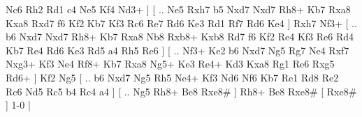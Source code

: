 Nc6  Rh2 Rd1  c4 Ne5  Kf4 Nd3+   ]  [ .. Ne5  Rxh7 b5  Nxd7 Nxd7  Rh8+ Kb7  Rxa8 Kxa8  Rxd7 f6  Kf2 Kb7  Kf3 Rc6  Re7 Rd6  Ke3 Rd1  Rf7 Rd6  Ke4   ]  Rxh7   Nf3+ [ .. b6  Nxd7 Nxd7  Rh8+ Kb7  Rxa8 Nb8  Rxb8+ Kxb8  Rd7 f6  Kf2 Re4  Kf3 Re6  Rd4 Kb7  Re4 Rd6  Ke3 Rd5  a4 Rh5  Re6   ]  [ .. Nf3+  Ke2 b6  Nxd7 Ng5  Rg7 Ne4  Rxf7 Nxg3+  Kf3 Ne4  Rf8+ Kb7  Rxa8 Ng5+  Ke3 Re4+  Kd3 Kxa8  Rg1 Re6  Rxg5 Rd6+   ]  Kf2   Ng5    [ .. b6  Nxd7 Ng5  Rh5 Ne4+  Kf3 Nd6  Nf6 Kb7  Re1 Rd8  Re2 Rc6  Nd5 Rc5  b4 Rc4  a4   ]  [ .. Ng5  Rh8+ Be8  Rxe8#   ]  Rh8+   Be8   Rxe8#    [  Rxe8#   ] 1-0  |

